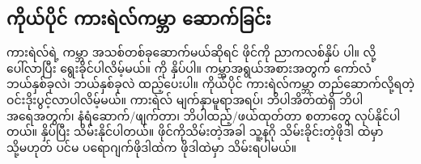 \clearpage

\subsection*{ကိုယ်ပိုင် ကားရဲလ်ကမ္ဘာ ဆောက်ခြင်း }
ကားရဲလ်ရဲ့ ကမ္ဘာ အသစ်တစ်ခုဆောက်မယ်ဆိုရင်  ဖိုင်ကို ညာကလစ်နှိပ်   ပါ။  လို့ ပေါ်လာပြီး  ရွေးခိုင်ပါလိမ့်မယ်။  ကို နှိပ်ပါ။ ကမ္ဘာအရွယ်အစားအတွက် ကော်လံ ဘယ်နှစ်ခုလဲ၊  ဘယ်နှစ်ခုလဲ ထည့်ပေးပါ။  ကိုယ်ပိုင် ကားရဲလ်ကမ္ဘာ တည်ဆောက်လို့ရတဲ့ ဝင်းဒိုးပွင့်လာပါလိမ့်မယ်။ ကားရဲလ် မျက်နှာမူရာအရပ်၊ ဘိပါအိတ်ထဲရှိ ဘိပါအရေအတွက်၊ နံရံဆောက်/ဖျက်တာ၊ ဘိပါထည့်/ဖယ်ထုတ်တာ စတာတွေ လုပ်နိုင်ပါတယ်။   နှိပ်ပြီး သိမ်းနိုင်ပါတယ်။ ဖိုင်ကိုသိမ်းတဲ့အခါ သူ့နဂို သိမ်းခိုင်းတဲ့ဖိုဒါ  ထဲမှာ သို့မဟုတ် ပင်မ ပရောဂျက်ဖိုဒါထဲက  ဖိုဒါထဲမှာ သိမ်းရပါမယ်။  

\begin{figure}[tbh!]
\caption{} 
\label{fig:default_worlds}
\end{figure}

\begin{figure}[tbh!]
\caption{} 
\label{fig:proj_worlds}
\end{figure}


